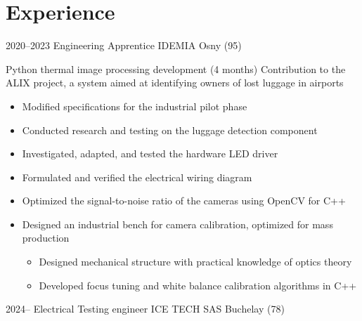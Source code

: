 \documentclass[11pt,a4paper]{moderncv}
\begin{document}
\section{Experience}
\cventry
    {2020--2023}
    {Engineering Apprentice}
    {IDEMIA}
    {Osny (95)}
    {}
    {
    Python thermal image processing development (4 months) \newline
    Contribution to the ALIX project, a system aimed at identifying owners of lost luggage in airports
    \begin{itemize}
        \setlength{\itemindent}{1cm}
        \item Modified specifications for the industrial pilot phase
        \item Conducted research and testing on the luggage detection component
        \item Investigated, adapted, and tested the hardware LED driver
        \item Formulated and verified the electrical wiring diagram
        \item Optimized the signal-to-noise ratio of the cameras using OpenCV for C++
        \item Designed an industrial bench for camera calibration, optimized for mass production
        \begin{itemize}
            \setlength{\itemindent}{1.5cm}
            \item Designed mechanical structure with practical knowledge of optics theory
            \item Developed focus tuning and white balance calibration algorithms in C++
        \end{itemize}
    \end{itemize}
    }
\cventry
    {2024--}
    {Electrical Testing engineer}
    {ICE TECH SAS}
    {Buchelay (78)}
    {}
\end{document}
